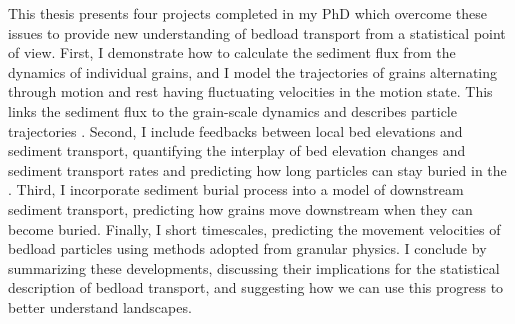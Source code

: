 This thesis presents four projects completed in my PhD which overcome these issues to provide new understanding of bedload transport from a statistical point of view.
First, I demonstrate how to calculate the sediment flux from the dynamics of individual grains, and I model the trajectories of grains alternating through motion and rest having fluctuating velocities in the motion state.
This \DIFdelbegin {}\DIFdelend links the sediment flux to the grain-scale dynamics and describes particle trajectories \DIFdelbegin {}\DIFdelend \DIFaddbegin {}\DIFaddend .
Second, I include feedbacks between local bed elevations and sediment transport, quantifying the interplay of bed elevation changes and sediment transport rates \DIFdelbegin \DIFdel{, }\DIFdelend and predicting how long particles can stay buried in the \DIFdelbegin {}\DIFdelend \DIFaddbegin {}\DIFaddend .
Third, I incorporate \DIFdelbegin {}\DIFdelend \DIFaddbegin {}\DIFaddend sediment burial process into a model of downstream sediment transport, predicting how grains move downstream when they can become buried.
Finally, I \DIFdelbegin {}\DIFdelend \DIFaddbegin {}\DIFaddend short timescales, predicting the movement velocities of bedload particles using methods adopted from granular physics.
I conclude by summarizing these developments, discussing their implications for the statistical description of bedload transport, and suggesting how we can use this \DIFdelbegin {}\DIFdelend \DIFaddbegin {}\DIFaddend progress to better understand landscapes.

